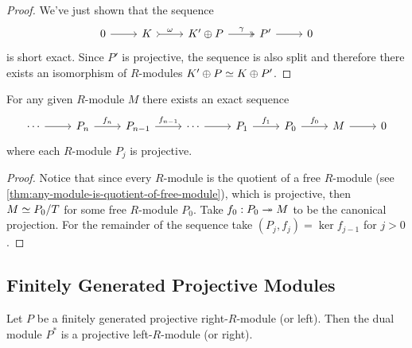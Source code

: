 \begin{proof}
    We've just shown that the sequence
    \[
        \begin{tikzcd}
            0 \ar[r]
            &K \ar[r, tail, "\omega"]
            &K' \oplus P \ar[r, two heads, "\gamma"]
            &P' \ar[r]
            &0
        \end{tikzcd}
    \]
    is short exact. Since \(P'\) is projective, the sequence is also split and
    therefore there exists an isomorphism of \(R\)-modules
    \(K' \oplus P \simeq K \oplus P'\).
\end{proof}

\begin{theorem}
    \label{thm:projective-resolution}
    For any given \(R\)-module \(M\) there exists an exact sequence
    \[
        \begin{tikzcd}
            \cdots \ar[r]
            &P_n \ar[r, "f_n"]
            &P_{n-1} \ar[r, "f_{n-1}"]
            &\cdots \ar[r]
            &P_1 \ar[r, "f_1"]
            &P_0 \ar[r, "f_0"]
            &M \ar[r]
            &0
        \end{tikzcd}
    \]
    where each \(R\)-module \(P_j\) is projective.
\end{theorem}

\begin{proof}
    Notice that since every \(R\)-module is the quotient of a free \(R\)-module (see
    \cref{thm:any-module-is-quotient-of-free-module}), which is projective, then
    \(M \simeq P_0/T\) for some free \(R\)-module \(P_0\). Take \(f_0: P_0 \twoheadrightarrow M\) to
    be the canonical projection. For the remainder of the sequence take
    \((P_j, f_j) = \ker f_{j-1}\) for \(j > 0\).
\end{proof}

\subsection{Finitely Generated Projective Modules}

\begin{proposition}
    \label{prop:fg-projective-then-dual-module-is-projective}
    Let \(P\) be a finitely generated projective right-\(R\)-module (or left). Then
    the dual module \(P^{*}\) is a projective left-\(R\)-module (or right).
\end{proposition}

